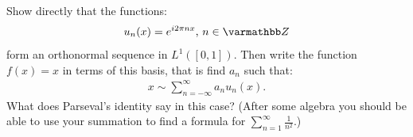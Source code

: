 \documentclass[10pt,oneside,openany]{memoir}
\begin{document}
\newpage
\begin{exercise}
Show directly that the functions:
    \begin{equation*}
    \begin{split}
        u_n(x) = e^{i2\pi n x}\text{, }n \in \bfZ
    \end{split}
    \end{equation*}
form an orthonormal sequence in $L^1([0,1])$. Then write the function $f(x) = x$ in terms of this basis, that is find $a_n$ such that:
    \begin{equation*}
    \begin{split}
        x \sim \sum_{n = -\infty}^\infty a_n u_n(x).
    \end{split}
    \end{equation*}
What does Parseval's identity say in this case? (After some algebra you should be able to use your summation to find a formula for $\sum_{n = 1}^\infty \frac{1}{n^2}$.)
\end{exercise}
\end{document}
